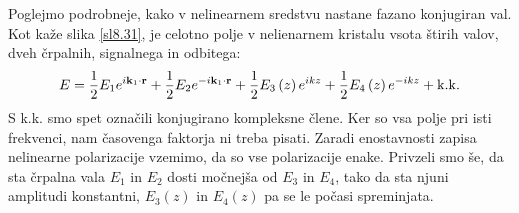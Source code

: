Poglejmo podrobneje, kako v nelinearnem sredstvu nastane fazano konjugiran
val. Kot kaže slika \ref{sl8.31}, je celotno polje v nelienarnem
kristalu vsota štirih valov, dveh črpalnih, signalnega in odbitega:
\begin{equation}
E=\frac{1}{2}E_{1}e^{i{\bf k}_{1}\cdot{\bf r}}+\frac{1}{2}E_{2}e^{-i{\bf k}_{1}\cdot{\bf r}}+\frac{1}{2}E_{3}\left(z\right)e^{ikz}+\frac{1}{2}E_{4}\left(z\right)e^{-ikz}+{\rm k.k.}\label{8.99}
\end{equation}
 S k.k. smo spet označili konjugirano kompleksne člene. Ker so vsa
polje pri isti frekvenci, nam časovenga faktorja ni treba pisati.
Zaradi enostavnosti zapisa nelinearne polarizacije vzemimo, da so
vse polarizacije enake. Privzeli smo še, da sta črpalna vala $E_{1}$
in $E_{2}$ dosti močnejša od $E_{3}$ in $E_{4}$, tako da sta njuni
amplitudi konstantni, $E_{3}\left(z\right)$ in $E_{4}\left(z\right)$
pa se le počasi spreminjata.

